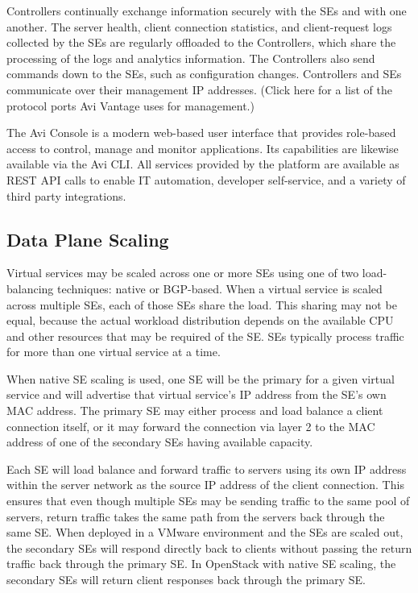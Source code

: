 \documentclass[letterpaper,10pt,english]{sphinxmanual}
\let\sphinxpxdimen\pdfpxdimen\else\newdimen\sphinxpxdimen
\begin{document}
Controllers continually exchange information securely with the SEs and with one another. The server health, client connection statistics, and client-request logs collected by the SEs are regularly offloaded to the Controllers, which share the processing of the logs and analytics information. The Controllers also send commands down to the SEs, such as configuration changes. Controllers and SEs communicate over their management IP addresses. (Click here for a list of the protocol ports Avi Vantage uses for management.)

\noindent{\sphinxincludegraphics[width=72\sphinxpxdimen]{{Master_Single_Icons-02}.png}\hspace*{\fill}}

 The Avi Console is a modern web-based user interface that  provides role-based access to control, manage and monitor applications. Its capabilities are likewise available via the Avi CLI. All services provided by the platform are available as REST API calls to enable IT automation, developer self-service, and a variety of third party integrations.


\subsection{Data Plane Scaling}
\label{\detokenize{getting_started/overview:data-plane-scaling}}
Virtual services may be scaled across one or more SEs using one of two load-balancing techniques: native or BGP-based. When a virtual service is scaled across multiple SEs, each of those SEs share the load. This sharing may not be equal, because the actual workload distribution depends on the available CPU and other resources that may be required of the SE. SEs typically process traffic for more than one virtual service at a time.

\noindent{\hspace*{\fill}\sphinxincludegraphics[width=452\sphinxpxdimen]{{architecture_3}.jpg}}

When native SE scaling is used, one SE will be the primary for a given virtual service and will advertise that virtual service's IP address from the SE's own MAC address. The primary SE may either process and load balance a client connection itself, or it may forward the connection via layer 2 to the MAC address of one of the secondary SEs having available capacity.

Each SE will load balance and forward traffic to servers using its own IP address within the server network as the source IP address of the client connection. This ensures that even though multiple SEs may be sending traffic to the same pool of servers, return traffic takes the same path from the servers back through the same SE. When deployed in a VMware environment and the SEs are scaled out, the secondary SEs will respond directly back to clients without passing the return traffic back through the primary SE. In OpenStack with native SE scaling, the secondary SEs will return client responses back through the primary SE.
\end{document}
